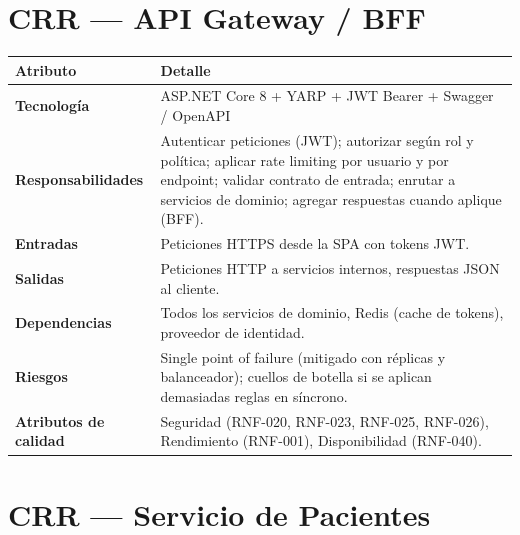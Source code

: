 \section{CRR --- API Gateway / BFF}

\begin{tabularx}{\textwidth}{>{\bfseries}L{3.5cm} X}
  \toprule
  \textbf{\color{fmAccent}Atributo} & \textbf{\color{fmAccent}Detalle} \\
  \midrule
  Tecnología & ASP.NET Core 8 + YARP + JWT Bearer + Swagger / OpenAPI \\
  Responsabilidades & Autenticar peticiones (JWT); autorizar según rol y política; aplicar rate limiting por usuario y por endpoint; validar contrato de entrada; enrutar a servicios de dominio; agregar respuestas cuando aplique (BFF). \\
  Entradas & Peticiones HTTPS desde la SPA con tokens JWT. \\
  Salidas & Peticiones HTTP a servicios internos, respuestas JSON al cliente. \\
  Dependencias & Todos los servicios de dominio, Redis (cache de tokens), proveedor de identidad. \\
  Riesgos & Single point of failure (mitigado con réplicas y balanceador); cuellos de botella si se aplican demasiadas reglas en síncrono. \\
  Atributos de calidad & Seguridad (RNF-020, RNF-023, RNF-025, RNF-026), Rendimiento (RNF-001), Disponibilidad (RNF-040). \\
  \bottomrule
\end{tabularx}

\section{CRR --- Servicio de Pacientes}

